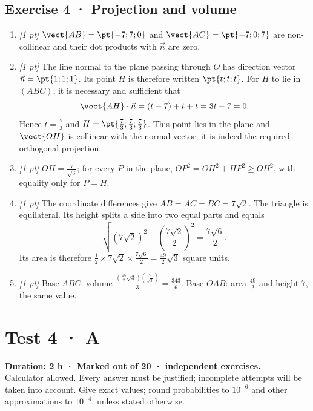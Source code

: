 \subsection*{Exercise 4 · Projection and volume}\begin{enumerate}

\item \textit{[1 pt]} $\vect{AB}=\pt{-7;7;0}$ and $\vect{AC}=\pt{-7;0;7}$ are non-collinear and their dot products with $\vec n$ are zero.

\item \textit{[1 pt]} The line normal to the plane passing through $O$ has direction vector $\vec n=\pt{1;1;1}$. Its point $H$ is therefore written $\pt{t;t;t}$. For $H$ to lie in $(ABC)$, it is necessary and sufficient that
\[\vect{AH}\cdot\vec n=(t-7)+t+t=3t-7=0.\]
Hence $t=\frac{7}{3}$ and $H=\pt{\frac{7}{3};\frac{7}{3};\frac{7}{3}}$. This point lies in the plane and $\vect{OH}$ is collinear with the normal vector; it is indeed the required orthogonal projection.

\item \textit{[1 pt]} $OH=\frac{7}{\sqrt{3}}$; for every $P$ in the plane, $OP^2=OH^2+HP^2\ge OH^2$, with equality only for $P=H$.

\item \textit{[1 pt]} The coordinate differences give $AB=AC=BC=7\sqrt2$. The triangle is equilateral. Its height splits a side into two equal parts and equals
\[\sqrt{(7\sqrt2)^2-(\frac{7\sqrt{2}}{2})^2}=\frac{7\sqrt6}{2}.\]
Its area is therefore $\frac12\times 7\sqrt2\times\frac{7\sqrt6}{2}=\frac{49}{2}\sqrt3$ square units.

\item \textit{[1 pt]} Base $ABC$: volume $\frac{(\frac{49}{2}\sqrt3)(\frac{7}{\sqrt{3}})}{3}=\frac{343}{6}$. Base $OAB$: area $\frac{49}{2}$ and height $7$, the same value.

\end{enumerate}

\fi

\ifmxteacher

\mxnewpage{}\label{sujet:6-3}

\section*{Test 4 · A}


\textbf{Duration: 2 h · Marked out of 20 ·  independent exercises.}\\Calculator allowed. Every answer must be justified; incomplete attempts will be taken into account. Give exact values; round probabilities to $10^{-6}$ and other approximations to $10^{-4}$, unless stated otherwise.

